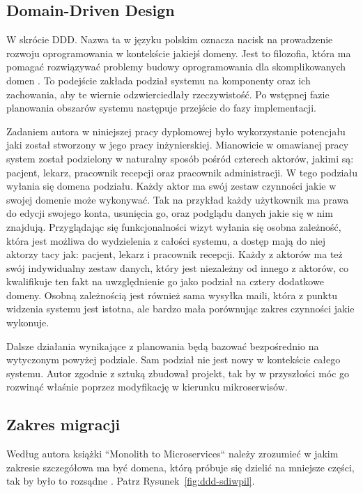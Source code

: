 \documentclass[12pt,twoside]{book}
\begin{document}
\subsection{Domain-Driven Design}
W skrócie DDD. Nazwa ta w języku polskim oznacza nacisk na prowadzenie rozwoju oprogramowania w kontekście jakiejś domeny. Jest to filozofia, która ma pomagać rozwiązywać problemy budowy oprogramowania dla skomplikowanych domen \cite{patterns.principles.and.practices.of.ddd}.
To podejście zakłada podział systemu na komponenty oraz ich zachowania, aby te wiernie odzwierciedlały rzeczywistość. Po wstępnej fazie planowania obszarów systemu następuje przejście do fazy implementacji.

Zadaniem autora w niniejszej pracy dyplomowej było wykorzystanie potencjału jaki został stworzony w jego pracy inżynierskiej. Mianowicie w omawianej pracy system został podzielony w naturalny sposób pośród czterech aktorów, jakimi są: pacjent, lekarz, pracownik recepcji oraz pracownik administracji. W tego podziału wyłania się domena podziału. Każdy aktor ma swój zestaw czynności jakie w swojej domenie może wykonywać. Tak na przykład każdy użytkownik ma prawa do edycji swojego konta, usunięcia go, oraz podglądu danych jakie się w nim znajdują. Przyglądając się funkcjonalności wizyt wyłania się osobna zależność, która jest możliwa do wydzielenia z całości systemu, a dostęp mają do niej aktorzy tacy jak: pacjent, lekarz i pracownik recepcji. Każdy z aktorów ma też swój indywidualny zestaw danych, który jest niezależny od innego z aktorów, co kwalifikuje ten fakt na uwzględnienie go jako podział na cztery dodatkowe domeny. Osobną zależnością jest również sama wysyłka maili, która z punktu widzenia systemu jest istotna, ale bardzo mała porównując zakres czynności jakie wykonuje.

Dalsze działania wynikające z planowania będą bazować bezpośrednio na wytyczonym powyżej podziale. Sam podział nie jest nowy w kontekście całego systemu. Autor zgodnie z sztuką zbudował projekt, tak by w przyszłości móc go rozwinąć właśnie poprzez modyfikację w kierunku mikroserwisów.

\subsection{Zakres migracji}
Według autora książki “Monolith to Microservices“ należy zrozumieć w jakim zakresie szczegółowa ma być domena, którą próbuje się dzielić na mniejsze części, tak by było to rozsądne \cite{monolith.to.microservices}. Patrz Rysunek~\ref{fig:ddd-sdiwpil}.
\end{document}
